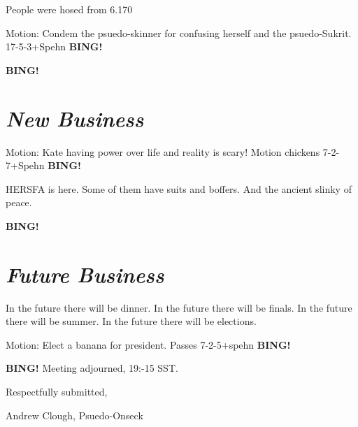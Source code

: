 \documentclass[10pt]{article}
\newcommand{\bing}{{\bf BING!} }
\newcommand{\goto}[1]{\bing \vskip 12pt \section*{{\em{#1}}}}
\begin{document}
People were hosed from 6.170

Motion:  Condem the psuedo-skinner for confusing herself and the psuedo-Sukrit.  17-5-3+Spehn \bing

\goto{New Business}

Motion:  Kate having power over life and reality is scary!  Motion chickens 7-2-7+Spehn \bing

HERSFA is here.  Some of them have suits and boffers.  And the ancient slinky of peace.

\goto{Future Business}

In the future there will be dinner.  In the future there will be finals.  In the future there will be summer.  In the future there will be elections.

Motion:  Elect a banana for president.  Passes 7-2-5+spehn \bing

\bing
\noindent
Meeting adjourned, 19:-15 SST.

\vspace{18pt}

\centerline{Respectfully submitted,}
\centerline{Andrew Clough, Psuedo-Onseck}
\end{document}
